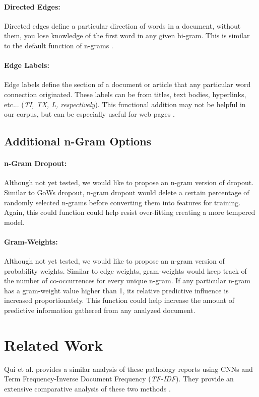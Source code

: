\documentclass[twoside,twocolumn]{article}
\begin{document}
\paragraph{Directed Edges:} Directed edges define a particular direction of words in a document, without them, you lose knowledge of the first word in any given bi-gram. This is similar to the default function of n-grams \cite{Markov:2006:FCW:1784815.1784819}.

\paragraph{Edge Labels:} Edge labels define the section of a document or article that any particular word connection originated. These labels can be from titles, text bodies, hyperlinks, etc... (\textit{TI, TX, L, respectively}). This functional addition may not be helpful in our corpus, but can be especially useful for web pages \cite{Schenker03classificationof}.


\subsection{Additional n-Gram Options}

\paragraph{n-Gram Dropout:} Although not yet tested, we would like to propose an n-gram version of dropout. Similar to GoWs dropout, n-gram dropout would delete a certain percentage of randomly selected n-grams before converting them into features for training. Again, this could function could help resist over-fitting creating a more tempered model.

\paragraph{Gram-Weights:} Although not yet tested, we would like to propose an n-gram version of probability weights. Similar to edge weights, gram-weights would keep track of the number of co-occurrences for every unique n-gram. If any particular n-gram has a gram-weight value higher than 1, its relative predictive influence is increased proportionately. This function could help increase the amount of predictive information gathered from any analyzed document.
\section*{Related Work}
Qui et al. provides a similar analysis of these pathology reports using CNNs and Term Frequency-Inverse Document Frequency (\textit{TF-IDF}). They provide an extensive comparative analysis of these two methods \cite{qiu2017deep}.
\end{document}
